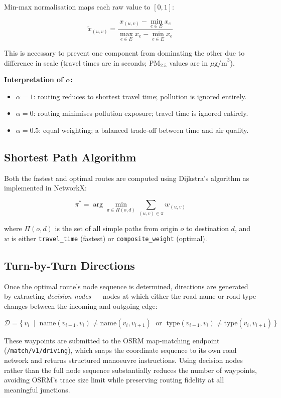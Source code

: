 \documentclass[12pt,a4paper]{article}
\begin{document}
Min-max normalisation maps each raw value to $[0, 1]$:

\[
  \tilde{x}_{(u,v)} = \frac{x_{(u,v)} - \min_{e \in E} x_e}{\max_{e \in E} x_e - \min_{e \in E} x_e}
\]

This is necessary to prevent one component from dominating the other due to difference in scale (travel times are in seconds; PM$_{2.5}$ values are in $\mu\text{g/m}^3$).

\textbf{Interpretation of $\alpha$:}
\begin{itemize}
  \item $\alpha = 1$: routing reduces to shortest travel time; pollution is ignored entirely.
  \item $\alpha = 0$: routing minimises pollution exposure; travel time is ignored entirely.
  \item $\alpha = 0.5$: equal weighting; a balanced trade-off between time and air quality.
\end{itemize}

\subsection{Shortest Path Algorithm}

Both the fastest and optimal routes are computed using Dijkstra's algorithm \cite{dijkstra1959} as implemented in NetworkX:

\[
  \pi^* = \arg\min_{\pi \in \Pi(o, d)} \sum_{(u,v) \in \pi} w_{(u,v)}
\]

where $\Pi(o, d)$ is the set of all simple paths from origin $o$ to destination $d$, and $w$ is either \texttt{travel\_time} (fastest) or \texttt{composite\_weight} (optimal).

\subsection{Turn-by-Turn Directions}

Once the optimal route's node sequence is determined, directions are generated by extracting \textit{decision nodes} --- nodes at which either the road name or road type changes between the incoming and outgoing edge:

\[
  \mathcal{D} = \bigl\{\, v_i \;\mid\; \text{name}(v_{i-1}, v_i) \neq \text{name}(v_i, v_{i+1}) \;\text{ or }\; \text{type}(v_{i-1}, v_i) \neq \text{type}(v_i, v_{i+1}) \,\bigr\}
\]

These waypoints are submitted to the OSRM map-matching endpoint (\texttt{/match/v1/driving}), which snaps the coordinate sequence to its own road network and returns structured manoeuvre instructions. Using decision nodes rather than the full node sequence substantially reduces the number of waypoints, avoiding OSRM's trace size limit while preserving routing fidelity at all meaningful junctions.
\end{document}
